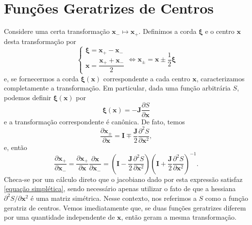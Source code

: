 \documentclass[
	12pt,
	oneside,			%
	a4paper,			%
	english,			%
	brazil				%
	]{abntex2}
\theoremstyle{definition}
\begin{document}
\section{Funções Geratrizes de Centros}
\label{funções geratrizes}

Considere uma certa transformação $\mathbf{x}_- \mapsto \mathbf{x}_+$. Definimos a corda $\boldsymbol{\xi}$ e o centro $\mathbf{x}$ desta transformação por
\begin{equation}
    \begin{cases}
        \boldsymbol{\xi} = \mathbf{x}_+ - \mathbf{x}_- \\
        \mathbf{x} = \dfrac{\mathbf{x}_++\mathbf{x}_-}{2}
    \end{cases} \Leftrightarrow \mathbf{x}_\pm = \mathbf{x} \pm \frac{1}{2}\boldsymbol{\xi}
\end{equation}
e, se fornecermos a corda $\boldsymbol{\xi}(\mathbf{x})$ correspondente a cada centro $\mathbf{x}$, caracterizamos completamente a transformação. Em particular, dada uma função arbitrária $S$, podemos definir $\boldsymbol{\xi}(\mathbf{x})$ por
\begin{equation}
    \boldsymbol{\xi}(\mathbf{x}) = -\mathbf{J} \frac{\partial S}{\partial \mathbf{x}}
\end{equation}
e a transformação correspondente é canônica. De fato, temos
\begin{equation}
    \frac{\partial \mathbf{x}_{\pm}}{ \partial \mathbf{x}} = \mathbf{I} \mp \frac{\mathbf{J}}{2} \frac{\partial^2 S}{\partial \mathbf{x}^2},
\end{equation}
e, então
\begin{equation}
\label{jacobiano transformação canônica de centro}
    \frac{\partial \mathbf{x}_+}{ \partial \mathbf{x}_-} = \frac{\partial \mathbf{x}_+}{ \partial \mathbf{x}} \frac{\partial \mathbf{x}}{ \partial \mathbf{x}_-} = \left(\mathbf{I} - \frac{\mathbf{J}}{2} \frac{\partial^2 S}{\partial \mathbf{x}^2}\right) \left(\mathbf{I} + \frac{\mathbf{J}}{2} \frac{\partial^2 S}{\partial \mathbf{x}^2}\right)^{-1}.
\end{equation}
Checa-se por um cálculo direto que o jacobiano dado por esta expressão satisfaz \eqref{equação simplética}, sendo necessário apenas utilizar o fato de que a hessiana $\partial^2 S/\partial \mathbf{x}^2$ é uma matriz simétrica. Nesse contexto, nos referimos a $S$ como a função geratriz de centros. Vemos imediatamente que, se duas funções geratrizes diferem por uma quantidade independente de $\mathbf{x}$, então geram a mesma transformação. 
\end{document}
